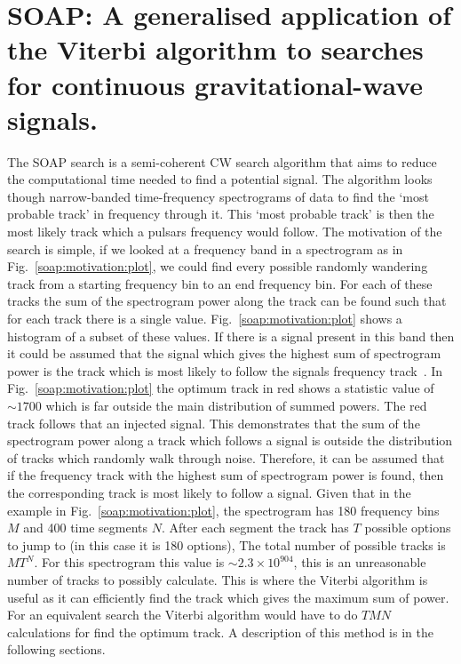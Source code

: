 \chapter[SOAP for CW searches.]{\label{soap} SOAP: A generalised application of the Viterbi algorithm to searches for continuous gravitational-wave signals.}

The SOAP search is a semi-coherent \gls{CW} search algorithm that aims to
reduce the computational time needed to find a potential signal.  The algorithm
looks though narrow-banded time-frequency spectrograms of data to find the
`most probable track' in frequency through it.  This `most probable track' is
then the most likely track which a pulsars frequency would follow.  The
motivation of the search is simple, if we looked at a frequency band in a
spectrogram as in Fig.~\ref{soap:motivation:plot}, we could find every possible
randomly wandering track from a starting frequency bin to an end frequency bin.
For each of these tracks the sum of the spectrogram power along the track can
be found such that for each track there is a single value.
Fig.~\ref{soap:motivation:plot} shows a histogram of a subset of these values.
If there is a signal present in this band then it could be assumed that the
signal which gives the highest sum of spectrogram power is the track which is
most likely to follow the signals frequency track~.  In
Fig.~\ref{soap:motivation:plot} the optimum track in red shows a
statistic value of $\sim 1700$ which is far outside the main distribution of
summed powers.  The red track follows that  an injected signal.  This
demonstrates that the sum of the spectrogram power along a track which follows
a signal is outside the distribution of tracks which randomly walk through noise.
Therefore, it can be assumed that if the frequency track with the highest sum
of spectrogram power is found, then the corresponding track is most likely
to follow a signal.  Given that in the example in Fig.~\ref{soap:motivation:plot}, the
spectrogram has 180 frequency bins $M$ and 400 time segments $N$.
After each segment the track has $T$ possible options to jump to (in this case
it is 180 options), The total number of possible tracks is $MT^{N}$.
For this spectrogram this value is $\sim 2.3 \times 10^{904}$, this is an unreasonable
number of tracks to possibly calculate. This is where the Viterbi algorithm
\citep{viterbi1967ErrorBounds} is useful as it can efficiently find the track
which gives the maximum sum of power. For an equivalent search the Viterbi
algorithm would have to do $TMN$ calculations for find the optimum track. A description of this method is in the following sections.

